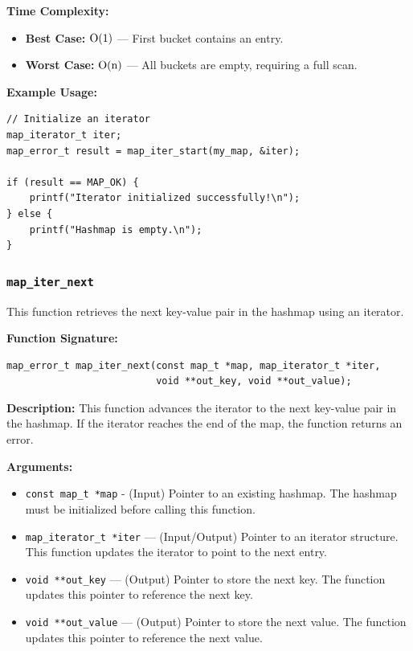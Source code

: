 \documentclass[titlepage]{article}
\begin{document}
\textbf{Time Complexity:}
\begin{itemize}
    \item \textbf{Best Case:} \( $O(1)$ \) --- First bucket contains an entry.
    \item \textbf{Worst Case:} \( $O(n)$ \) --- All buckets are empty, requiring a full scan.
\end{itemize}

\textbf{Example Usage:}
\begin{verbatim}
// Initialize an iterator
map_iterator_t iter;
map_error_t result = map_iter_start(my_map, &iter);

if (result == MAP_OK) {
    printf("Iterator initialized successfully!\n");
} else {
    printf("Hashmap is empty.\n");
}
\end{verbatim}

\subsubsection{\texttt{map\_iter\_next}}

This function retrieves the next key-value pair in the hashmap using an iterator.

\textbf{Function Signature:}
\begin{verbatim}
map_error_t map_iter_next(const map_t *map, map_iterator_t *iter,
                          void **out_key, void **out_value);
\end{verbatim}

\textbf{Description:}
This function advances the iterator to the next key-value pair in the hashmap.
If the iterator reaches the end of the map, the function returns an error.

\textbf{Arguments:}
\begin{itemize}
    \item \texttt{const map\_t *map} - (Input) Pointer to an existing hashmap.
    The hashmap must be initialized before calling this function.

    \item \texttt{map\_iterator\_t *iter} --- (Input/Output) Pointer to an iterator structure.
    This function updates the iterator to point to the next entry.

    \item \texttt{void **out\_key} --- (Output) Pointer to store the next key.
    The function updates this pointer to reference the next key.

    \item \texttt{void **out\_value} --- (Output) Pointer to store the next value.
    The function updates this pointer to reference the next value.
\end{itemize}
\end{document}
